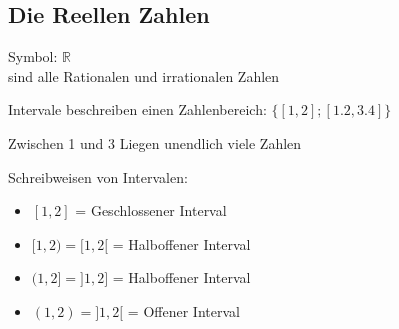 \subsection{Die Reellen Zahlen}
Symbol: $\mathbb{R}$\\
sind alle Rationalen und irrationalen Zahlen

\hfill \break
Intervale beschreiben einen Zahlenbereich: $\{[1,2];[1.2,3.4]\}$


\hfill \break
{}

\hfill \break
Zwischen 1 und 3 Liegen unendlich viele Zahlen


\hfill \break
Schreibweisen von Intervalen:
\begin{itemize}
    \item $[1,2]$ = Geschlossener Interval
    \item $[1,2) = [1,2[$ = Halboffener Interval
    \item $(1,2] = ]1,2]$ = Halboffener Interval
    \item $(1,2) = ]1,2[$ = Offener Interval
\end{itemize}



